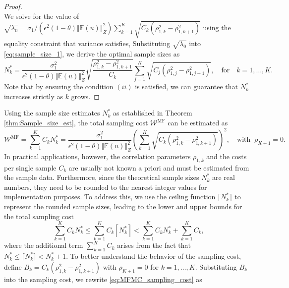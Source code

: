 \begin{proof}
\begin{equation*}
\end{equation*}
%
We solve for the value of $\sqrt{\lambda_0}=\sigma_1/(\epsilon^2(1-\theta)\left\Vert\mathbb{E}(u) \right\Vert_{Z}^2)\sum_{k=1}^K\sqrt{C_k(\rho_{1,k}^2-\rho_{1,k+1}^2)}$ using the equality constraint that variance satisfies,  
Substituting $\sqrt{\lambda_0}$ into \eqref{eq:sample_size_1}, we derive the optimal sample sizes as
%
\[
N_k^* = \frac{\sigma_1^2}{\epsilon^2(1-\theta)\left\Vert\mathbb{E}(u) \right\Vert_{Z}^2}\sqrt{\frac{\rho_{1,k}^2-\rho_{1,k+1}^2}{C_k}}\sum_{j=1}^K\sqrt{C_j\left(\rho_{1,j}^2-\rho_{1,j+1}^2\right)},\quad \text{for}\quad  k=1,\ldots,K.
\]
%
Note that by ensuring the condition $(ii)$ is satisfied, we can guarantee that $N_k^*$ increases strictly as $k$ grows. 
\end{proof}
%
Using the sample size estimates $N_k^*$ as established in Theorem \ref{thm:Sample_size_est}, the total sampling cost $\mathcal{W}^\text{MF}$ can be estimated as
%
\begin{equation}\label{eq:MFMC_sampling_cost}
    \mathcal{W}^\text{MF} = \sum_{k=1}^K C_k N_k^* = \frac{\sigma_1^2}{\epsilon^2(1-\theta)\left\Vert\mathbb{E}(u) \right\Vert_{Z}^2}\left(\sum_{k=1}^K\sqrt{C_k\left(\rho_{1,k}^2 - \rho_{1,k+1}^2\right)}\right)^2,\quad \text{with}\;\;\rho_{K+1}=0.
\end{equation}
%
In practical applications, however, the correlation parameters $\rho_{1,k}$ and the costs per single sample $C_k$ are usually not known a priori and must be estimated from the sample data. Furthermore, since the theoretical sample sizes $N_k^*$ are real numbers, they need to be rounded to the nearest integer values for implementation purposes. To address this, we use the ceiling function $\lceil N_k^* \rceil$ to represent the rounded sample sizes, leading to the lower and upper bounds for the total sampling cost
%
\begin{equation}\label{eq:sampling_cost_bound}
    \sum_{k=1}^K C_k N_k^*\le \sum_{k=1}^K C_k \left\lceil N_k^*\right\rceil<\sum_{k=1}^K C_k N_k^* + \sum_{k=1}^K C_k,
\end{equation}
%
where the additional term $\sum_{k=1}^K C_k$ arises from the fact that $N_k^*\le \lceil N_k^*\rceil< N_k^*+1$. To better understand the behavior of the sampling cost, define $B_k = C_k(\rho_{1,k}^2 - \rho_{1,k+1}^2)$ with $\rho_{K+1}=0$ for $k=1,\dots, K$. Substituting $B_k$ into the sampling cost, we rewrite \eqref{eq:MFMC_sampling_cost} as
